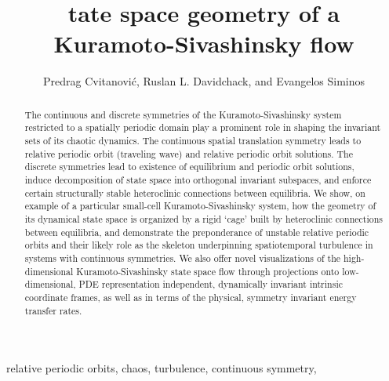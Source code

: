 \documentclass{siamltex}          %
\begin{document}
                \title{
tate space geometry of a
Kuramoto-Sivashinsky flow 
                 }
                  \author{
Predrag Cvitanovi\'c\footnotemark[1],
Ruslan L. Davidchack\footnotemark[2],
    and
Evangelos Siminos\footnotemark[1]
                    }

                \maketitle

\renewcommand{\thefootnote}{\fnsymbol{footnote}}
\renewcommand{\thefootnote}{\arabic{footnote}}

                \begin{abstract}
The continuous and discrete symmetries of the
Kuramoto-Sivashinsky system restricted to a spatially
periodic domain play a prominent role in shaping the
invariant sets of its chaotic dynamics. The continuous
spatial translation symmetry leads to relative periodic orbit
(traveling wave) and relative periodic orbit
 solutions. The discrete
symmetries lead to existence of {equilibrium} and periodic
orbit solutions, induce decomposition of state space into
orthogonal invariant subspaces, and enforce certain
structurally stable heteroclinic connections between
equilibria. We show, on example of a particular small-cell
Kuramoto-Sivashinsky system, how the geometry of its
dynamical state space is organized by a rigid `cage' built by
heteroclinic connections between equilibria, and demonstrate
the preponderance of unstable relative periodic orbits and
their likely role as the skeleton underpinning spatiotemporal
turbulence in systems with continuous symmetries. We also
offer novel visualizations of the high-dimensional
Kuramoto-Sivashinsky state space flow through projections
onto low-dimensional, PDE representation independent,
dynamically invariant intrinsic coordinate frames, as well as
in terms of the physical, symmetry invariant energy transfer
rates.
                \end{abstract}

\begin{keywords}
relative periodic orbits, chaos, turbulence, continuous symmetry, {\KSe}
\end{keywords}
\end{document}
